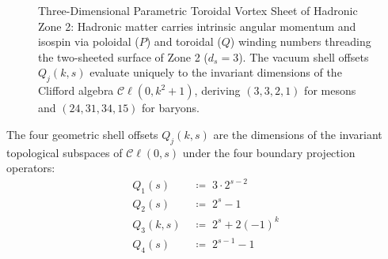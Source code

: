 \documentclass[
    12pt,
    a4paper,
    headings=normal,
    twoside=false,
    open=any,
    parskip=half
]{scrbook}
\begin{document}
\begin{figure}[htbp]
\caption{Three-Dimensional Parametric Toroidal Vortex Sheet of Hadronic Zone 2: Hadronic matter carries intrinsic angular momentum and isospin via poloidal ($P$) and toroidal ($Q$) winding numbers threading the two-sheeted surface of Zone 2 ($d_s = 3$). The vacuum shell offsets $Q_j(k, s)$ evaluate uniquely to the invariant dimensions of the Clifford algebra $\mathcal{C}\ell(0, k^2+1)$, deriving $(3, 3, 2, 1)$ for mesons and $(24, 31, 34, 15)$ for baryons.}
\label{fig:ch3_toroidal_vortex_3d}
\end{figure}

\begin{phystheorem}\label{thm:ch3_clifford_shell_offsets}
The four geometric shell offsets $Q_j(k, s)$ are the dimensions of the invariant topological subspaces of $\mathcal{C}\ell(0, s)$ under the four boundary projection operators:
\begin{align}
Q_1(s) &\;\coloneqq\; 3 \cdot 2^{s-2} \label{eq:ch3_Q1_formula} \\
Q_2(s) &\;\coloneqq\; 2^s - 1 \label{eq:ch3_Q2_formula} \\
Q_3(k, s) &\;\coloneqq\; 2^s + 2(-1)^k \label{eq:ch3_Q3_formula} \\
Q_4(s) &\;\coloneqq\; 2^{s-1} - 1 \label{eq:ch3_Q4_formula}
\end{align}
\end{phystheorem}
\end{document}
